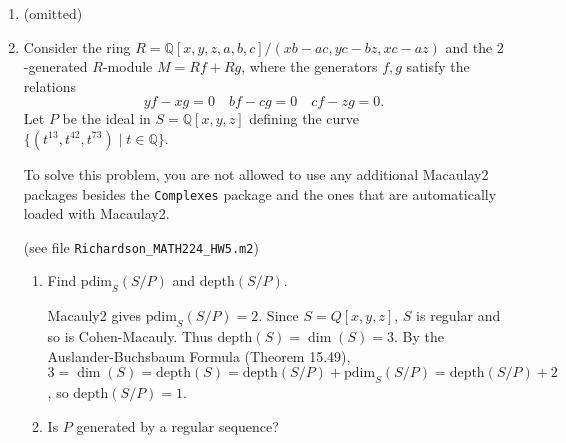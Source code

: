 \documentclass[11pt,oneside,english]{amsart}
\theoremstyle{definition}
\begin{document}
\begin{enumerate}[leftmargin=*]
\begin{enumerate}
\begin{proof}
Let $P$ be a prime ideal in $R$. Since $R$ is regular, $\text{pdim}_R(R/P)<\infty$ by Theorem 15.36 so there exists finite free resolution of $R/P$ over $R$:
\[
\xymatrix{0 \ar[r] & R^{\beta_c} \ar[r] & \cdots \ar[r] & R^{\beta_1} \ar[r] & R \ar[r] & R/P \ar[r] & 0}
\]
But by Theorem 4.25 on p. 51, localizing is exact, and since localizing distributes over direct sums, we have a corresponding exact sequence:
\[
\xymatrix{0 \ar[r] & R_P^{\beta_c} \ar[r] & \cdots \ar[r] & R_P^{\beta_1} \ar[r] & R_P \ar[r] & (R/P)_P \ar[r] & 0}
\]
Therefore, $(R/P)_P$ has a finite free resolution over $R_P$, i.e. $\text{pdim}_{R/P}((R/P)_P)=\text{pdim}(R_P/P_P)<\infty$. So by Theorem 15.36, every finitely generated $R_P$-module has finite projective dimension, and so $R_P$ is regular.
\end{proof}

\end{enumerate}

\item (omitted)

\item Consider the ring $R = \mathbb{Q}[x,y,z,a,b,c]/(xb-ac,yc-bz,xc-az)$ and the $2$-generated $R$-module $M = Rf + Rg$, where the generators $f, g$ satisfy the relations 
\[
yf-xg = 0 \quad bf - cg = 0 \quad cf - zg = 0.
\]
Let $P$ be the ideal in $S = \mathbb{Q}[x,y,z]$ defining the curve $\lbrace (t^{13},t^{42},t^{73}) \mid t \in \mathbb{Q} \rbrace$.

To solve this problem, you are not allowed to use any additional Macaulay2 packages besides the \texttt{Complexes} package and the ones that are automatically loaded with Macaulay2.

(see file \verb!Richardson_MATH224_HW5.m2!)
\begin{enumerate}
\item Find $\text{pdim}_S(S/P)$ and $\text{depth}(S/P)$. 

Macauly2 gives $\text{pdim}_S(S/P)=2$. Since $S=Q[x,y,z]$, $S$ is regular and so is Cohen-Macauly. Thus $\text{depth}(S)=\dim(S)=3$. By the Auslander-Buchsbaum Formula (Theorem 15.49), $3=\dim(S)=\text{depth}(S)=\text{depth}(S/P)+\text{pdim}_S(S/P)=\text{depth}(S/P)+2$, so $\text{depth}(S/P)=1$.
\item Is $P$ generated by a regular sequence?


\end{enumerate}
\end{enumerate}
\end{document}
